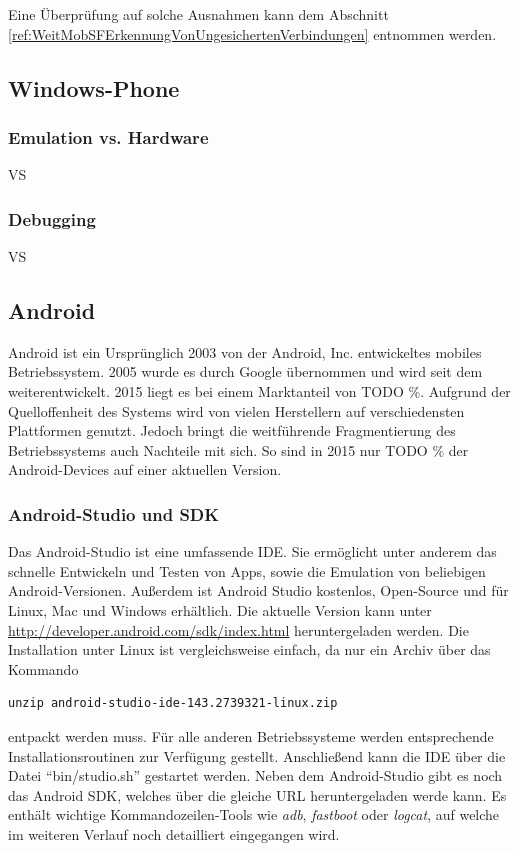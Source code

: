 Eine Überprüfung auf solche Ausnahmen kann dem Abschnitt \ref{ref:WeitMobSFErkennungVonUngesichertenVerbindungen} entnommen werden.

		\subsection{Windows-Phone}
			\subsubsection{Emulation vs. Hardware}
			VS
			\subsubsection{Debugging}
			VS
			
		\subsection{Android}
			Android ist ein Ursprünglich 2003 von der Android, Inc. entwickeltes mobiles Betriebssystem. 2005 wurde es durch Google übernommen und wird seit dem weiterentwickelt. 2015 liegt es bei einem Marktanteil von TODO \%. Aufgrund der Quelloffenheit des Systems wird von vielen Herstellern auf verschiedensten Plattformen genutzt. Jedoch bringt die weitführende Fragmentierung des Betriebssystems auch Nachteile mit sich. So sind in 2015 nur TODO \% der Android-Devices auf einer aktuellen Version.\cite{Drake2014}
			
			\subsubsection{Android-Studio und SDK}
			Das Android-Studio ist eine umfassende IDE. Sie ermöglicht unter anderem das schnelle Entwickeln und Testen von Apps, sowie die Emulation von beliebigen Android-Versionen. Außerdem ist Android Studio kostenlos, Open-Source und für Linux, Mac und Windows erhältlich. Die aktuelle Version kann unter \url{http://developer.android.com/sdk/index.html} heruntergeladen werden. Die Installation unter Linux ist vergleichsweise einfach, da nur ein Archiv über das Kommando 
\begin{lstlisting}
unzip android-studio-ide-143.2739321-linux.zip
\end{lstlisting}
entpackt werden muss. Für alle anderen Betriebssysteme werden entsprechende Installationsroutinen zur Verfügung gestellt. Anschließend kann die IDE über die Datei "`bin/studio.sh"' gestartet werden. Neben dem Android-Studio gibt es noch das Android SDK, welches über die gleiche URL heruntergeladen werde kann. Es enthält wichtige Kommandozeilen-Tools wie \textit{adb}, \textit{fastboot} oder \textit{logcat}, auf welche im weiteren Verlauf noch detailliert eingegangen wird.

